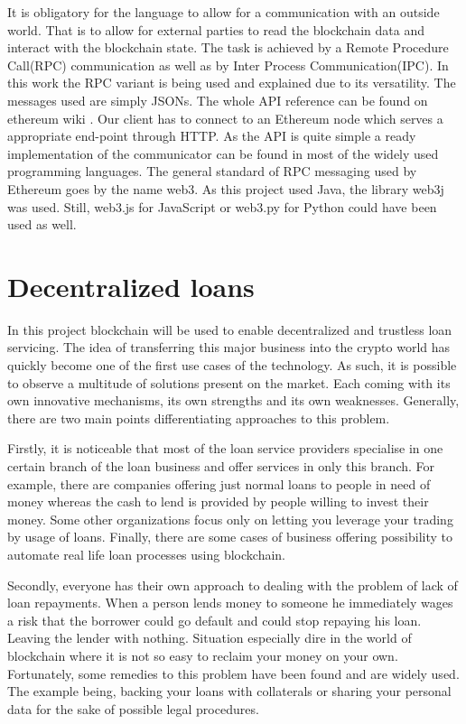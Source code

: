 \documentclass[a4paper,12pt,twoside,openany]{report}
\begin{document}
It is obligatory for the language to allow for a communication with an outside world. That is to allow for external parties to read the blockchain data and interact with the blockchain state. The task is achieved by a Remote Procedure Call(RPC) communication as well as by Inter Process Communication(IPC). In this work the RPC variant is being used and explained due to its versatility. The messages used are simply JSONs. The whole API reference can be found on ethereum wiki \cite{RPC}.  Our client has to connect to an Ethereum node which serves a appropriate end-point through HTTP. As the API is quite simple a ready implementation of the communicator can be found in most of the widely used programming languages. The general standard of RPC messaging used by Ethereum goes by the name web3. As this project used Java, the library web3j was used. Still, web3.js for JavaScript or web3.py for Python could have been used as well.

\chapter{Decentralized loans}

In this project blockchain will be used to enable decentralized and trustless loan servicing. The idea of transferring this major business into the crypto world has quickly become one of the first use cases of the technology. As such, it is possible to observe a multitude of solutions present on the market. Each coming with its own innovative mechanisms, its own strengths and its own weaknesses. Generally, there are two main points differentiating approaches to this problem. 

Firstly, it is noticeable that most of the loan service providers specialise in one certain branch of the loan business and offer services in only this branch. For example, there are companies offering just normal loans to people in need of money whereas the cash to lend is provided by people willing to invest their money. Some other organizations focus only on letting you leverage your trading by usage of loans. Finally, there are some cases of business offering possibility to automate real life loan processes using blockchain.     

Secondly, everyone has their own approach to dealing with the problem of lack of loan repayments. When a person lends money to someone he immediately wages a risk that the borrower could go default and could stop repaying his loan. Leaving the lender with nothing. Situation especially dire in the world of blockchain where it is not so easy to reclaim your money on your own. Fortunately, some remedies to this problem have been found and are widely used. The example being, backing your loans with collaterals or sharing your personal data for the sake of possible legal procedures.
\end{document}
